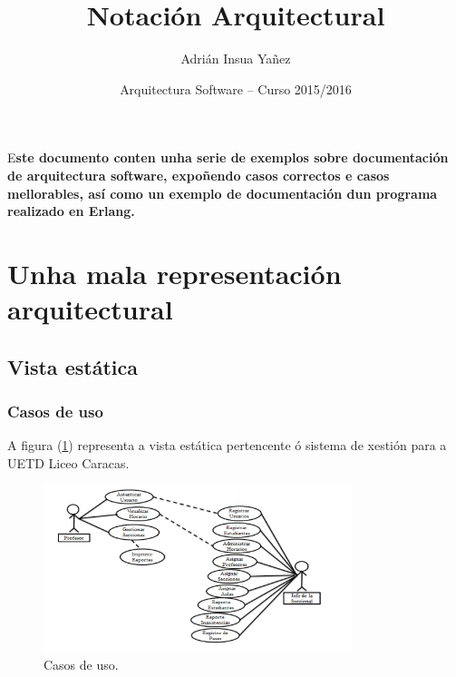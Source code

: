 \documentclass[DIV=calc,paper=a4,fontsize=11pt,onecolumn]{scrartcl}	 %
\title{Notación Arquitectural} %
\author{Adrián Insua Yañez} %
\date{Arquitectura Software -- Curso 2015/2016} %
\newcommand{\initial}[1]{ %
\lettrine[lines=3,lhang=0.3,nindent=0em]{
\color{UDC}
{\textsf{#1}}}{}}
\begin{document}
\maketitle %

\thispagestyle{fancy} %


\initial{E}\textbf{ste documento conten unha serie de exemplos sobre documentación de arquitectura software, expoñendo casos correctos e casos mellorables, así como un exemplo de documentación dun programa realizado en Erlang.}

\vspace*{1cm}

\tableofcontents

\clearpage


\section{Unha mala representación arquitectural}

\subsection{Vista estática}
\subsubsection{Casos de uso}
A figura (\ref{fig:estMal}) representa a vista estática pertencente ó sistema de xestión para a UETD Liceo Caracas.\cite{UETD}
\begin{figure}[h]
\centering
\includegraphics[width = 0.8\textwidth]{./figuras/estaticaMal.png}
\caption{Casos de uso.}
\label{fig:estMal}
\end{figure}
\end{document}
